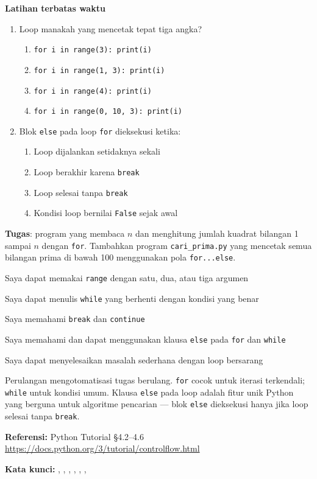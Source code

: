 ﻿\documentclass[../main.tex]{subfiles}
\begin{document}
\begin{asesmen}
\textbf{Latihan terbatas waktu}

\begin{enumerate}
  \item Loop manakah yang mencetak tepat tiga angka?
  \begin{enumerate}
    \item \texttt{for i in range(3): print(i)}
    \item \texttt{for i in range(1, 3): print(i)}
    \item \texttt{for i in range(4): print(i)}
    \item \texttt{for i in range(0, 10, 3): print(i)}
  \end{enumerate}
  \item Blok \texttt{else} pada loop \texttt{for} dieksekusi ketika:
  \begin{enumerate}
    \item Loop dijalankan setidaknya sekali
    \item Loop berakhir karena \texttt{break}
    \item Loop selesai tanpa \texttt{break}
    \item Kondisi loop bernilai \texttt{False} sejak awal
  \end{enumerate}
\end{enumerate}

\textbf{Tugas}: program yang membaca $n$ dan menghitung jumlah kuadrat bilangan 1 sampai $n$ dengan \texttt{for}. Tambahkan program \texttt{cari\_prima.py} yang mencetak semua bilangan prima di bawah 100 menggunakan pola \texttt{for...else}.
\end{asesmen}

\begin{checklist}
  \item Saya dapat memakai \texttt{range} dengan satu, dua, atau tiga argumen
  \item Saya dapat menulis \texttt{while} yang berhenti dengan kondisi yang benar
  \item Saya memahami \texttt{break} dan \texttt{continue}
  \item Saya memahami dan dapat menggunakan klausa \texttt{else} pada \texttt{for} dan \texttt{while}
  \item Saya dapat menyelesaikan masalah sederhana dengan loop bersarang
\end{checklist}

\begin{rangkuman}
Perulangan mengotomatisasi tugas berulang. \texttt{for} cocok untuk iterasi terkendali; \texttt{while} untuk kondisi umum. Klausa \texttt{else} pada loop adalah fitur unik Python yang berguna untuk algoritme pencarian --- blok \texttt{else} dieksekusi hanya jika loop selesai tanpa \texttt{break}.

\textbf{Referensi:} {\small Python Tutorial §4.2--4.6 \url{https://docs.python.org/3/tutorial/controlflow.html}}

\textbf{Kata kunci:} , , , , , , 
\end{rangkuman}
\end{document}
